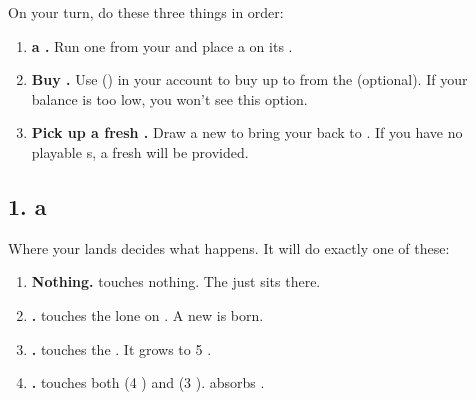 On your turn, do these three things in order:

\begin{enumerate}
  \item \textbf{ a .} Run one  from your  and place a  on its .
  \item \textbf{Buy .} Use  () in your account to buy up to   from the  (optional). If your balance is too low, you won't see this option.
  \item \textbf{Pick up a fresh .} Draw a new  to bring your  back to . If you have no playable s, a fresh  will be provided.
\end{enumerate}

\subsection{1.  a }
Where your  lands decides what happens. It will do exactly one of these:

\begin{center}
\end{center}

\begin{enumerate}[label=\textbf{\arabic*.},leftmargin=1.6em]
  \item \textbf{Nothing.}  touches nothing. The  just sits there.
  \item \textbf{.}  touches the lone  on . A new  is born.
  \item \textbf{.}  touches the  . It grows to 5 .
  \item \textbf{.}  touches both  (4 ) and  (3 ).
     absorbs .
\end{enumerate}

